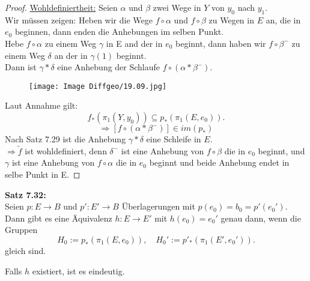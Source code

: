 \documentclass[fleqn, 12pt, letterpaper]{article}
\begin{document}
\begin{proof}
\underline{Wohldefiniertheit:} 
Seien \( \alpha \) und \( \beta \) zwei Wege in \( Y \) von \( y_0 \) nach \( y_1 \). \\
Wir müssen zeigen: Heben wir die Wege \( f \circ \alpha \) und \( f \circ \beta \) zu Wegen in \( E \) an, die in \( e_0 \) beginnen, dann enden die Anhebungen im selben Punkt.\\

Hebe $f\circ\alpha$ zu einem Weg $\gamma$ in E and der in $e_0$ beginnt, dann haben wir $f\circ\beta^-$ zu einem Weg $\delta$ an der in $\gamma(1)$ beginnt.\\
Dann ist \( \gamma*\delta \) eine Anhebung der Schlaufe $f\circ(\alpha*\beta^-)$.

  \begin{figure}[H]
    \centering
    \texttt{[image: Image Diffgeo/19.09.jpg]}
 \end{figure}

Laut Annahme gilt:
\[
f_*\left(\pi_1(Y, y_0)\right) \subseteq p_*\left(\pi_1(E, e_0)\right).
\]
\[
\Rightarrow[f\circ(\alpha*\beta^-)]\in im(p_*)
\]
Nach {Satz 7.29} ist die Anhebung \( \gamma*\delta \) eine Schleife in \( E \). \\
\( \Rightarrow \tilde{f} \) ist wohldefiniert, denn \( \delta^-\) ist eine Anhebung von $f\circ\beta$ die in \( e_0 \) beginnt, und $\gamma$ ist eine Anhebung von $f\circ\alpha$ die in $e_0$ beginnt und beide Anhebung endet in selbe Punkt in E.
\end{proof}

\textbf{Satz 7.32:} \\
Seien \( p : E \to B \) und \( p' : E' \to B \) Überlagerungen mit $p(e_0)=b_0=p'(e_0')$. Dann gibt es eine Äquivalenz \( h : E \to E' \) mit \(h(e_0)=e_0' \) genau dann, wenn die Gruppen
\[
H_0 := p_* \left( \pi_1(E, e_0) \right), \quad H_0' := p'_* \left( \pi_1(E', e_0') \right).
\] 
gleich sind.

Falls \( h \) existiert, ist es eindeutig.
\end{document}
